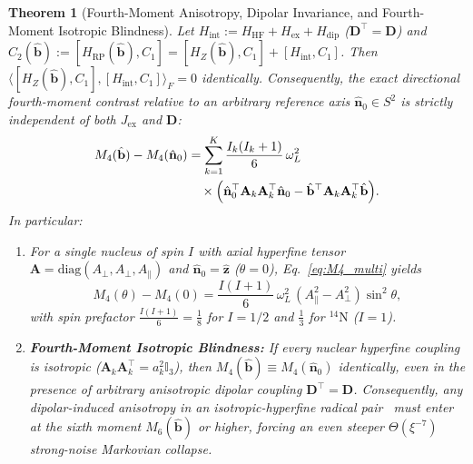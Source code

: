 \documentclass[twocolumn,10pt,amsmath,amssymb,floatfix]{revtex4-2}
\theoremstyle{plain}
\newtheorem{theorem}{Theorem}
\theoremstyle{definition}
\newcommand{\HRP}{H_{\mathrm{RP}}}
\newcommand{\HZ}{H_Z}
\newcommand{\HHF}{H_{\mathrm{HF}}}
\newcommand{\Hex}{H_{\mathrm{ex}}}
\newcommand{\Hdip}{H_{\mathrm{dip}}}
\begin{document}
\begin{theorem}[Fourth-Moment Anisotropy, Dipolar Invariance, and Fourth-Moment Isotropic Blindness]
\label{thm:M4}
Let $H_{\mathrm{int}} := \HHF + \Hex + \Hdip$ ($\mathbf{D}^\top = \mathbf{D}$) and $C_2(\hat{\mathbf{b}}) := [\HRP(\hat{\mathbf{b}}), C_1] = [\HZ(\hat{\mathbf{b}}), C_1] + [H_{\mathrm{int}}, C_1]$. Then $\langle [\HZ(\hat{\mathbf{b}}), C_1], [H_{\mathrm{int}}, C_1]\rangle_F = 0$ identically. Consequently, the exact directional fourth-moment contrast relative to an arbitrary reference axis $\hat{\mathbf{n}}_0 \in S^2$ is strictly independent of both $J_{\mathrm{ex}}$ and $\mathbf{D}$:
\begin{align}
\label{eq:M4_multi}
M_4(\hat{\mathbf{b}}) - M_4(\hat{\mathbf{n}}_0) &= \sum_{k=1}^K \frac{I_k(I_k+1)}{6}\,\omega_L^2 \nonumber\\
&\quad \times \Bigl(\hat{\mathbf{n}}_0^\top \mathbf{A}_k \mathbf{A}_k^\top \hat{\mathbf{n}}_0 - \hat{\mathbf{b}}^\top \mathbf{A}_k \mathbf{A}_k^\top \hat{\mathbf{b}}\Bigr).
\end{align}
In particular:
\begin{enumerate}[label=(\alph*),leftmargin=1.5em,itemsep=1pt]
\item For a single nucleus of spin $I$ with axial hyperfine tensor $\mathbf{A} = \mathrm{diag}(A_\perp, A_\perp, A_\parallel)$ and $\hat{\mathbf{n}}_0 = \hat{\mathbf{z}}$ ($\theta = 0$), Eq.~\eqref{eq:M4_multi} yields
\begin{equation}
\label{eq:M4_axial}
M_4(\theta) - M_4(0) = \frac{I(I+1)}{6}\,\omega_L^2\,(A_\parallel^2 - A_\perp^2)\sin^2\theta,
\end{equation}
with spin prefactor $\frac{I(I+1)}{6} = \frac{1}{8}$ for $I=1/2$ and $\frac{1}{3}$ for $^{14}\mathrm{N}$ ($I=1$).
\item \textbf{Fourth-Moment Isotropic Blindness:} If every nuclear hyperfine coupling is isotropic ($\mathbf{A}_k \mathbf{A}_k^\top = a_k^2\mathbb{I}_3$), then $M_4(\hat{\mathbf{b}}) \equiv M_4(\hat{\mathbf{n}}_0)$ identically, even in the presence of arbitrary anisotropic dipolar coupling $\mathbf{D}^\top = \mathbf{D}$. Consequently, any dipolar-induced anisotropy in an isotropic-hyperfine radical pair~\cite{Hogben2012PRL} must enter at the sixth moment $M_6(\hat{\mathbf{b}})$ or higher, forcing an even steeper $\Theta(\xi^{-7})$ strong-noise Markovian collapse.
\end{enumerate}
\end{theorem}
\end{document}
